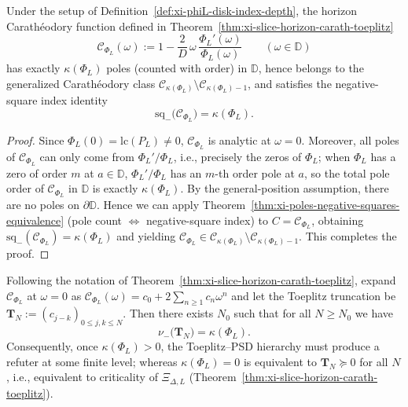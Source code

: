 \begin{theorem}\label{thm:xi-phiL-negative-squares-equals-disk-roots}
Under the setup of Definition~\ref{def:xi-phiL-disk-index-depth}, the horizon Carathéodory function defined in Theorem~\ref{thm:xi-slice-horizon-carath-toeplitz}
\[
\mathscr{C}_{\Phi_L}(\omega):=1-\frac{2}{D}\,\omega\,\frac{\Phi_L'(\omega)}{\Phi_L(\omega)}
\qquad(\omega\in\mathbb{D})
\]
has exactly \(\kappa(\Phi_L)\) poles (counted with order) in \(\mathbb{D}\), hence belongs to the generalized Carathéodory class \(\mathcal{C}_{\kappa(\Phi_L)}\setminus\mathcal{C}_{\kappa(\Phi_L)-1}\), and satisfies the negative-square index identity
\[
\boxed{\ \mathrm{sq}_-\!\bigl(\mathscr{C}_{\Phi_L}\bigr)=\kappa(\Phi_L).\ }
\]
\end{theorem}

\begin{proof}
Since \(\Phi_L(0)=\mathrm{lc}(P_L)\neq 0\), \(\mathscr{C}_{\Phi_L}\) is analytic at \(\omega=0\).
Moreover, all poles of \(\mathscr{C}_{\Phi_L}\) can only come from \(\Phi_L'/\Phi_L\), i.e., precisely the zeros of \(\Phi_L\); when \(\Phi_L\) has a zero of order \(m\) at \(a\in\mathbb{D}\), \(\Phi_L'/\Phi_L\) has an \(m\)-th order pole at \(a\), so the total pole order of \(\mathscr{C}_{\Phi_L}\) in \(\mathbb{D}\) is exactly \(\kappa(\Phi_L)\).
By the general-position assumption, there are no poles on \(\partial\mathbb{D}\).
Hence we can apply Theorem~\ref{thm:xi-poles-negative-squares-equivalence} (pole count \(\Longleftrightarrow\) negative-square index) to \(C=\mathscr{C}_{\Phi_L}\), obtaining \(\mathrm{sq}_-(\mathscr{C}_{\Phi_L})=\kappa(\Phi_L)\) and yielding \(\mathscr{C}_{\Phi_L}\in\mathcal{C}_{\kappa(\Phi_L)}\setminus\mathcal{C}_{\kappa(\Phi_L)-1}\). This completes the proof.
\end{proof}

\begin{corollary}\label{cor:xi-phiL-toeplitz-inertia-stabilizes}
Following the notation of Theorem~\ref{thm:xi-slice-horizon-carath-toeplitz}, expand \(\mathscr{C}_{\Phi_L}\) at \(\omega=0\) as
\(
\mathscr{C}_{\Phi_L}(\omega)=c_0+2\sum_{n\ge 1}c_n\omega^n
\)
and let the Toeplitz truncation be
\(
\mathbf{T}_N:=(c_{j-k})_{0\le j,k\le N}
\).
Then there exists \(N_0\) such that for all \(N\ge N_0\) we have
\[
\boxed{\;
\nu_-\!\bigl(\mathbf{T}_N\bigr)=\kappa(\Phi_L).\;}
\]
Consequently, once \(\kappa(\Phi_L)>0\), the Toeplitz--PSD hierarchy must produce a refuter at some finite level; whereas \(\kappa(\Phi_L)=0\) is equivalent to \(\mathbf{T}_N\succeq 0\) for all \(N\), i.e., equivalent to criticality of \(\Xi_{\Delta,L}\) (Theorem~\ref{thm:xi-slice-horizon-carath-toeplitz}).
\end{corollary}

